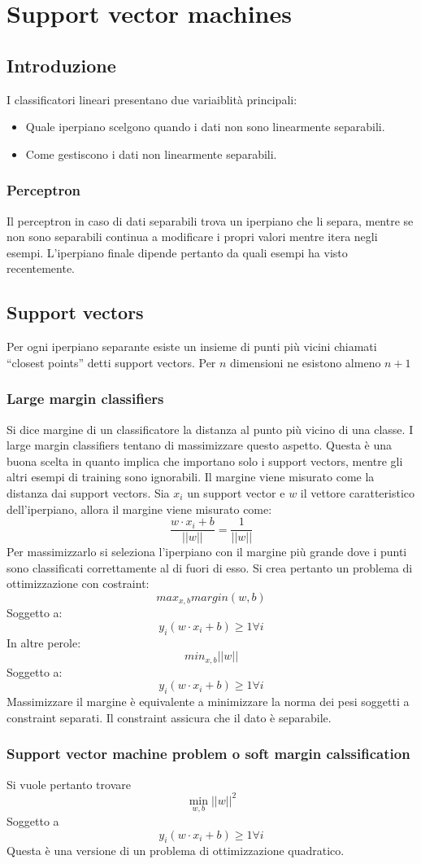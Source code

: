 \chapter{Support vector machines}

\section{Introduzione}
I classificatori lineari presentano due variaiblit\`a principali:
\begin{multicols}{2}
	\begin{itemize}
		\item Quale iperpiano scelgono quando i dati non sono linearmente separabili.
		\item Come gestiscono i dati non linearmente separabili.
	\end{itemize}
\end{multicols}

	\subsection{Perceptron}
	Il perceptron in caso di dati separabili trova un iperpiano che li separa, mentre se non sono separabili continua a modificare i propri valori mentre itera negli esempi.
	L'iperpiano finale dipende pertanto da quali esempi ha visto recentemente.

\section{Support vectors}
Per ogni iperpiano separante esiste un insieme di punti pi\`u vicini chiamati ``closest points'' detti support vectors.
Per $n$ dimensioni ne esistono almeno $n+1$

	\subsection{Large margin classifiers}
	Si dice margine di un classificatore la distanza al punto pi\`u vicino di una classe.
	I large margin classifiers tentano di massimizzare questo aspetto.
	Questa \`e una buona scelta in quanto implica che importano solo i support vectors, mentre gli altri esempi di training sono ignorabili.
	Il margine viene misurato come la distanza dai support vectors.
	Sia $x_i$ un support vector e $w$ il vettore caratteristico dell'iperpiano, allora il margine viene misurato come:
	$$\dfrac{w\cdot x_i+b}{||w||}=\dfrac{1}{||w||}$$
	Per massimizzarlo si seleziona l'iperpiano con il margine pi\`u grande dove i punti sono classificati correttamente al di fuori di esso.
	Si crea pertanto un problema di ottimizzazione con costraint:
	$$max_{x,b} margin(w,b)$$
	Soggetto a:
	$$y_i(w\cdot x_i+b)\ge 1 \forall i$$
	In altre perole:
	$$min_{x,b} ||w||$$
	Soggetto a:
	$$y_i(w\cdot x_i+b)\ge 1 \forall i$$
	Massimizzare il margine \`e equivalente a minimizzare la norma dei pesi soggetti a constraint separati.
	Il constraint assicura che il dato \`e separabile.

	\subsection{Support vector machine problem o soft margin calssification}
	Si vuole pertanto trovare
	$$\min_{w,b} ||w||^2$$
	Soggetto a 
	$$y_i(w\cdot x_i+b)\ge 1 \forall i$$
	Questa \`e una versione di un problema di ottimizzazione quadratico.

